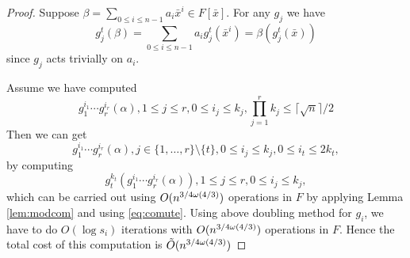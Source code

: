\begin{proof}
Suppose $\beta = \sum_{0\leq i \leq n-1} a_i \bar{x}^i \in F[\bar{x}]$. For any $g_j$ we have 
\begin{equation}\label{eq:comute}
g_j^t(\beta) = \sum_{0\leq i \leq n-1} a_i g_j^t(\bar{x}^i) = \beta(g_j^t(\bar{x}))
\end{equation}
since $g_j$ acts trivially on $a_i$. 

Assume we have computed $$g_1^{i_1}\cdots g_r^{i_r}(\alpha) , 1 \leq j \leq r, 
0 \leq i_j \leq k_j, \prod_{j = 1}^r k_j \leq \lceil \sqrt{n} \rceil/2$$
Then we can get $$g_1^{i_1}\cdots g_r^{i_r}(\alpha) , j \in \lbrace 1, \ldots , r \rbrace \setminus \lbrace t \rbrace , 
0 \leq i_j \leq k_j, 0 \leq i_t \leq 2k_t,$$
by computing 
$$g_t^{k_t}(g_1^{i_1}\cdots g_r^{i_r}(\alpha)) , 1 \leq j \leq r, 
0 \leq i_j \leq k_j,$$
which can be carried out using $O(n^{3/4 \omega(4/3)})$ operations in $F$ by applying Lemma \ref{lem:modcom} and using \eqref{eq:comute}.
Using above doubling method for $g_i$, we have to do $O(\log s_i)$ iterations with $O(n^{3/4 \omega(4/3)})$ operations in $F$. Hence the total cost of this 
computation is $\tilde{O}(n^{3/4 \omega(4/3)})$


\end{proof}
